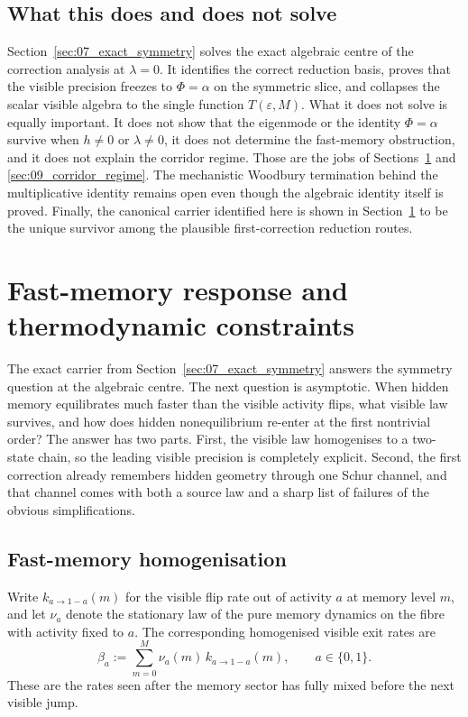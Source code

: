 \documentclass[11pt]{article}
\numberwithin{equation}{section}
\newcommand{\eps}{\varepsilon}
\theoremstyle{thmcompact}
\theoremstyle{remark}
\begin{document}
\subsection{What this does and does not solve}

Section~\ref{sec:07_exact_symmetry} solves the exact algebraic centre of the correction analysis at $\lambda=0$. It identifies the correct reduction basis, proves that the visible precision freezes to $\Phi=\alpha$ on the symmetric slice, and collapses the scalar visible algebra to the single function $T(\eps,M)$. What it does not solve is equally important. It does not show that the eigenmode or the identity $\Phi=\alpha$ survive when $h\neq0$ or $\lambda\neq0$, it does not determine the fast-memory obstruction, and it does not explain the corridor regime. Those are the jobs of Sections~\ref{sec:08_fast_memory} and \ref{sec:09_corridor_regime}. The mechanistic Woodbury termination behind the multiplicative identity remains open even though the algebraic identity itself is proved. Finally, the canonical carrier identified here is shown in Section~\ref{sec:08_fast_memory} to be the unique survivor among the plausible first-correction reduction routes.

\section{Fast-memory response and thermodynamic constraints}
\label{sec:08_fast_memory}

The exact carrier from Section~\ref{sec:07_exact_symmetry} answers the symmetry question at the algebraic centre. The next question is asymptotic. When hidden memory equilibrates much faster than the visible activity flips, what visible law survives, and how does hidden nonequilibrium re-enter at the first nontrivial order? The answer has two parts. First, the visible law homogenises to a two-state chain, so the leading visible precision is completely explicit. Second, the first correction already remembers hidden geometry through one Schur channel, and that channel comes with both a source law and a sharp list of failures of the obvious simplifications.

\subsection{Fast-memory homogenisation}

Write $k_{a\to 1-a}(m)$ for the visible flip rate out of activity $a$ at memory level $m$, and let $\nu_a$ denote the stationary law of the pure memory dynamics on the fibre with activity fixed to $a$. The corresponding homogenised visible exit rates are
\begin{equation}\label{eq:beta-hom-def}
\beta_a:=\sum_{m=0}^M \nu_a(m)\,k_{a\to 1-a}(m),
\qquad a\in\{0,1\}.
\end{equation}
These are the rates seen after the memory sector has fully mixed before the next visible jump.
\end{document}
